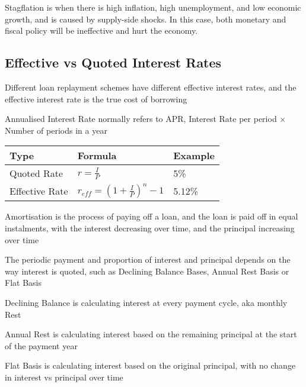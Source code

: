 Stagflation is when there is high inflation, high unemployment, and low economic growth, and is caused by supply-side shocks. In this case,
both monetary and fiscal policy will be ineffective and hurt the economy.

\subsection{Effective vs Quoted Interest Rates}
Different loan replayment schemes have different effective interest rates, and the effective interest rate is the true cost of borrowing

Annualised Interest Rate normally refers to APR, Interest Rate per period $\times$ Number of periods in a year


\begin{tabularx}{\linewidth}{X X X}
\toprule
\textbf{Type} & \textbf{Formula} & \textbf{Example} \\
\midrule
Quoted Rate & $r = \frac{I}{P}$ & 5\% \\
\midrule
Effective Rate & $r_{eff} = (1 + \frac{I}{P})^n - 1$ & 5.12\% \\
\bottomrule
\end{tabularx}

Amortisation is the process of paying off a loan, and the loan is paid off in equal instalments, with the interest decreasing over time, and the principal increasing over time

The periodic payment and proportion of interest and principal depends on the way interest is quoted, such as Declining Balance Bases, Annual Rest Basis or Flat Basis

Declining Balance is calculating interest at every payment cycle, aka monthly Rest

Annual Rest is calculating interest based on the remaining principal at the start of the payment year

Flat Basis is calculating interest based on the original principal, with no change in interest vs principal over time

